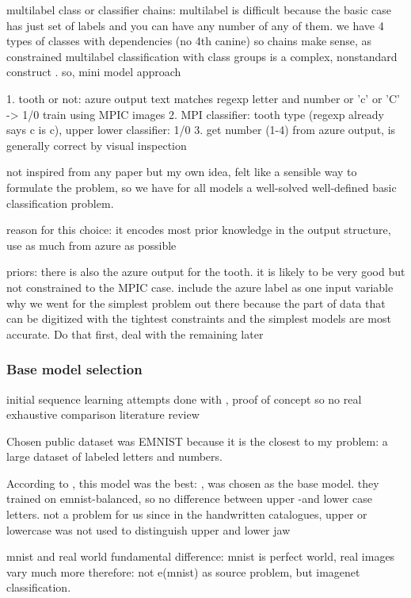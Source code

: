\documentclass{article}
\begin{document}
multilabel class or classifier chains:
multilabel is difficult because the basic case has just set of labels and you can 
have any number of any of them. we have 4 types of classes with dependencies (no 4th canine)
so chains make sense, as constrained multilabel classification with class groups is a 
complex, nonstandard construct \cite{multilabel_classification}. so, mini model approach 

1. tooth or not: azure output text matches regexp letter and number or 'c' or 'C' -> 1/0 train using MPIC images
2. MPI classifier: tooth type (regexp already says c is c), upper lower classifier: 1/0
3. get number (1-4) from azure output, is generally correct by visual inspection

not inspired from any paper but my own idea, felt like a sensible way to formulate the problem, 
so we have for all models a well-solved well-defined basic classification problem.

reason for this choice: it encodes most prior knowledge in the output structure,
use as much from azure as possible

priors:
there is also the azure output for the tooth. it is likely to be very good but not constrained to the MPIC case.
include the azure label as one input variable
why we went for the simplest problem out there
because the part of data that can be digitized with the tightest constraints and the simplest models are most accurate. Do that first, deal with the remaining later
\subsubsection{Base model selection}

initial sequence learning attempts done with \cite{li2021trocr}, proof of concept so no real exhaustive comparison literature review

Chosen public dataset was EMNIST \cite{emnist} because it is the closest to my problem: a large dataset of labeled letters and numbers.

According to \cite{emnistclassifiersurvey}, this model was the best: \cite{jamilemnist}, was chosen as the base model.
they trained on emnist-balanced, so no difference between upper -and lower case letters. not a problem for us since 
in the handwritten catalogues, upper or lowercase was not used to distinguish upper and lower jaw

mnist and real world fundamental difference: mnist is perfect world, real images vary much more \cite{alexnet}
therefore: not e(mnist) as source problem, but imagenet classification.
\end{document}
